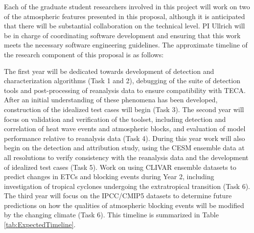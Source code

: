 \documentclass[11pt]{article}
\begin{document}
Each of the graduate student researchers involved in this project will work on two of the atmospheric features presented in this proposal, although it is anticipated that there will be substantial collaboration on the technical level.  PI Ullrich will be in charge of coordinating software development and ensuring that this work meets the necessary software engineering guidelines.  The approximate timeline of the research component of this proposal is as follows:

The first year will be dedicated towards development of detection and characterization algorithms (Task 1 and 2), debugging of the suite of detection tools and post-processing of reanalysis data to ensure compatibility with TECA.  After an initial understanding of these phenomena has been developed, construction of the idealized test cases will begin (Task 3).  The second year will focus on validation and verification of the toolset, including detection and correlation of heat wave events and atmospheric blocks, and evaluation of model performance relative to reanalysis data (Task 4).  During this year work will also begin on the detection and attribution study, using the CESM ensemble data at all resolutions to verify consistency with the reanalysis data and the development of idealized test cases (Task 5).  Work on using CLIVAR ensemble datasets to predict changes in ETCs and blocking events during Year 2, including investigation of tropical cyclones undergoing the extratropical transition (Task 6).  The third year will focus on the IPCC/CMIP5 datasets to determine future predictions on how the qualities of atmospheric blocking events will be modified by the changing climate (Task  6).  This timeline is summarized in Table \ref{tab:ExpectedTimeline}.
\end{document}
